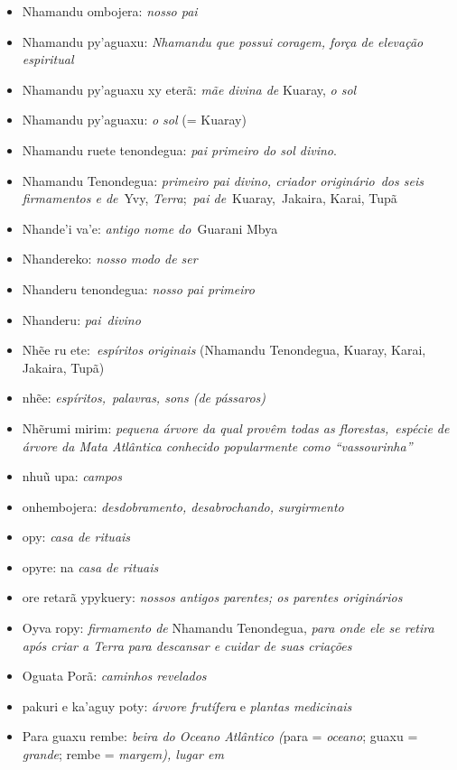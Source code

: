\begin{itemize}
\item
  Nhamandu ombojera: \emph{nosso pai}
\item
  Nhamandu py'aguaxu: \emph{Nhamandu que possui coragem, força de
  elevação espiritual}
\item
  Nhamandu py'aguaxu xy eterã: \emph{mãe divina de} Kuaray, \emph{o sol}
\item
  Nhamandu py'aguaxu: \emph{o sol} (= Kuaray)
\item
  Nhamandu ruete tenondegua: \emph{pai primeiro do sol divino}.
\item
  Nhamandu Tenondegua: \emph{primeiro pai divino, criador
  originário}~\emph{dos seis firmamentos e de}~Yvy,
  \emph{Terra};~\emph{pai de}~Kuaray,{}~Jakaira, Karai, Tupã
\item
  Nhande'i va'e: \emph{antigo nome do}~Guarani Mbya
\item
  Nhandereko: \emph{nosso modo de ser}
\item
  Nhanderu tenondegua: \emph{nosso pai primeiro}
\item
  Nhanderu: \emph{pai}~\emph{divino}
\item
  Nhẽe ru ete:~\emph{espíritos originais} (Nhamandu Tenondegua, Kuaray,
  Karai, Jakaira, Tupã)
\item
  nhẽe: \emph{espíritos,}~\emph{palavras, sons (de pássaros)}
\item
  Nhẽrumi mirim: \emph{pequena árvore da qual provêm todas as
  florestas,}~\emph{espécie de árvore da Mata Atlântica conhecido
  popularmente como ``vassourinha''}
\item
  nhuũ upa: \emph{campos}
\item
  onhembojera: \emph{desdobramento, desabrochando, surgirmento}
\item
  opy: \emph{casa de rituais}
\item
  opyre: na \emph{casa de rituais}
\item
  ore retarã ypykuery: \emph{nossos antigos parentes; os parentes
  originários}
\item
  Oyva ropy: \emph{firmamento de} Nhamandu Tenondegua, \emph{para onde
  ele se retira após criar a Terra para descansar e cuidar de suas
  criações}
\item
  Oguata Porã: \emph{caminhos revelados}
\item
  pakuri e ka'aguy poty: \emph{árvore frutífera} e \emph{plantas
  medicinais}
\item
  Para guaxu rembe: \emph{beira do Oceano Atlântico (}para =
  \emph{oceano}; guaxu = \emph{grande}; rembe = \emph{margem), lugar em}

\end{itemize}
